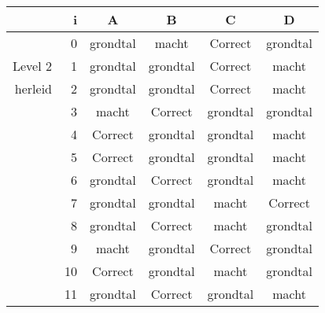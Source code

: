 \begin{tabular}{ rr| c|c|c|c}\hline\hline
     & i & \textbf{A} & \textbf{B} & \textbf{C} & \textbf{D}\\\hline

&0&grondtal&macht&Correct\cellcolor[gray]{0.6}&grondtal\\
Level 2 & 1&grondtal&grondtal&Correct\cellcolor[gray]{0.6}&macht\\
herleid &2&grondtal&grondtal&Correct\cellcolor[gray]{0.6}&macht\\
&3&macht&Correct\cellcolor[gray]{0.6}&grondtal&grondtal\\
&4&Correct\cellcolor[gray]{0.6}&grondtal&grondtal&macht\\
&5&Correct\cellcolor[gray]{0.6}&grondtal&grondtal&macht\\
&6&grondtal&Correct\cellcolor[gray]{0.6}&grondtal&macht\\
&7&grondtal&grondtal&macht&Correct\cellcolor[gray]{0.6}\\
&8&grondtal&Correct\cellcolor[gray]{0.6}&macht&grondtal\\
&9&macht&grondtal&Correct\cellcolor[gray]{0.6}&grondtal\\
&10&Correct\cellcolor[gray]{0.6}&grondtal&macht&grondtal\\
&11&grondtal&Correct\cellcolor[gray]{0.6}&grondtal&macht\\
\hline\end{tabular}\par\ \newline


